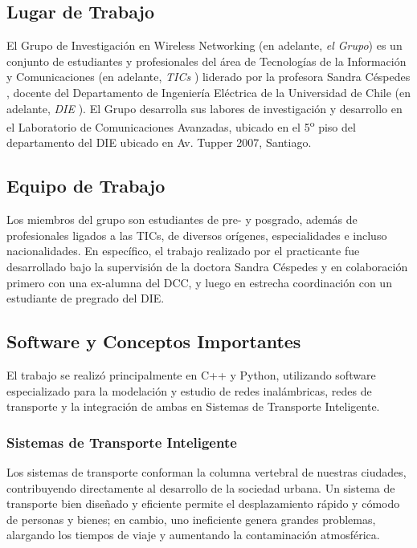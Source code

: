 \documentclass[11pt,letterpaper]{article}
\begin{document}
\subsection{Lugar de Trabajo}

El Grupo de Investigación en Wireless Networking (en adelante, \emph{el Grupo}) es un conjunto de estudiantes y profesionales del área de Tecnologías de la Información y Comunicaciones (en adelante, \emph{TICs} \cite{TICS}) liderado por la profesora Sandra Céspedes \cite{scespedes}, docente del Departamento de Ingeniería Eléctrica de la Universidad de Chile (en adelante, \emph{DIE} \cite{DIE}). El Grupo desarrolla sus labores de investigación y desarrollo en el Laboratorio de Comunicaciones Avanzadas, ubicado en el 5\textsuperscript{o} piso del departamento del DIE ubicado en Av. Tupper 2007, Santiago.

\subsection{Equipo de Trabajo}

Los miembros del grupo son estudiantes de pre- y posgrado, además de profesionales ligados a las TICs, de diversos orígenes, especialidades e incluso nacionalidades. En específico, el trabajo realizado por el practicante fue desarrollado bajo la supervisión de la doctora Sandra Céspedes y en colaboración primero con una ex-alumna del DCC, y luego en estrecha coordinación con un estudiante de pregrado del DIE.

\newpage
\subsection{Software y Conceptos Importantes}

El trabajo se realizó principalmente en C++ y Python, utilizando software especializado para la modelación y estudio de redes inalámbricas, redes de transporte y la integración de ambas en Sistemas de Transporte Inteligente.

\subsubsection{Sistemas de Transporte Inteligente}

Los sistemas de transporte conforman la columna vertebral de nuestras ciudades, contribuyendo directamente al desarrollo de la sociedad urbana. Un sistema de transporte bien diseñado y eficiente permite el desplazamiento rápido y cómodo de personas y bienes; en cambio, uno ineficiente genera grandes problemas, alargando los tiempos de viaje y aumentando la contaminación atmosférica.
\end{document}
